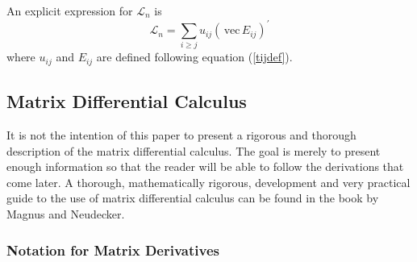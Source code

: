 \documentclass[12pt,thmsa,suthesis,verbatim]{report}
\begin{document}
An explicit expression for $\mathcal{L}_n$ is 
\begin{equation}
\mathcal{L}_n=\sum_{i\geq j}u_{ij}\left( \,\mathrm{vec}\,E_{ij}\right)
^{\prime }
\end{equation}
where $u_{ij}$ and $E_{ij}$ are defined following equation (\ref{tijdef}).

\subsection{Matrix Differential Calculus}

It is not the intention of this paper to present a rigorous and thorough
description of the matrix differential calculus. The goal is merely to
present enough information so that the reader will be able to follow the
derivations that come later. A thorough, mathematically rigorous,
development and very practical guide to the use of matrix differential
calculus can be found in the book by Magnus and Neudecker\cite{MagNeud88}.

\subsubsection{Notation for Matrix Derivatives}
\end{document}
